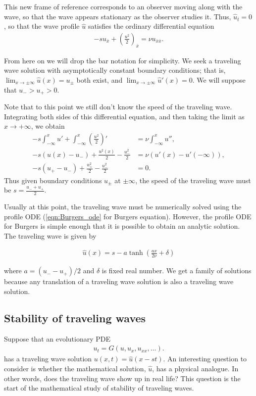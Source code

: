 This new frame of reference corresponds to an observer moving along with the wave, so that the wave appears stationary as the observer studies it.
Thus, $\hat{u}_{\bar{t}} = 0$, so that the wave profile $\hat{u}$ satisfies the ordinary differential equation
\begin{align}
	 -s u_{\bar{x}}+ \left(\frac{u^2}{2} \right)_{\bar{x}} = \nu u_{\bar{x}\bar{x}}.
	\label{eqn:Burgers_ode}
\end{align}

From here on we will drop the bar notation for simplicity.
We seek a traveling wave solution with asymptotically constant boundary conditions; that is,  $\lim_{x \to \pm \infty}\hat{u}(x) = u_{\pm}$ both exist, and  $\lim_{x \to \pm \infty} \hat{u}'(x) = 0$.
We will suppose that $u_- > u_+ > 0$.

Note that to this point we still don't know the speed of the traveling wave.
Integrating both sides of this differential equation, and then taking the limit as $x \to +\infty$, we obtain
\begin{align*}
-s\int_{-\infty}^x u' + \int_{-\infty}^x \left(\frac{u^2}{2}\right)' &= \nu \int_{-\infty}^x u'',\\
-s(u(x) - u_-) + \frac{u^2(x)}{2} - \frac{u_-^2}{2} &= \nu (u'(x) - u'(-\infty)), \\
-s(u_+ - u_-) + \frac{u_+^2}{2} - \frac{u_-^2}{2} &= 0.
\end{align*}
Thus given boundary conditions $u_{\pm}$ at $\pm \infty$, the speed of the traveling wave must be $s = \frac{u_- + u_+}{2}$.

Usually at this point, the traveling wave must be numerically solved using the profile ODE (\eqref{eqn:Burgers_ode} for Burgers equation).
However, the profile ODE for Burgers is simple enough that it is possible to obtain an analytic solution.
The traveling wave is  given by

\begin{align}
\hat{u}(x) = s - a \tanh \left(\frac{ax }{2\nu} + \delta\right)
\label{eqn:waveeqn:uhat}
\end{align}

where $a = (u_- - u_+)/2$ and $\delta$ is fixed real number.
We get a family of solutions because any translation of a traveling wave solution is also a traveling wave solution.

\subsection*{Stability of traveling waves}
Suppose that an evolutionary PDE
\begin{align}
u_t = G(u,u_x, u_{xx}, \ldots).
\label{eqn:evol_pde_repeat}
\end{align}
has a traveling wave solution $u(x,t) = \hat{u}(x-st)$.
An interesting question to consider is whether the mathematical solution, $\hat{u}$, has a physical analogue.
In other words, does the traveling wave show up in real life?
This question is the start of the mathematical study of stability of traveling waves.

